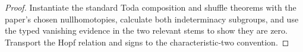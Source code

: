\begin{proof}
  Instantiate the standard Toda composition and shuffle theorems with the
  paper's chosen nullhomotopies, calculate both indeterminacy subgroups, and
  use the typed vanishing evidence in the two relevant stems to show they are
  zero.  Transport the Hopf relation and signs to the characteristic-two
  convention.
\end{proof}

